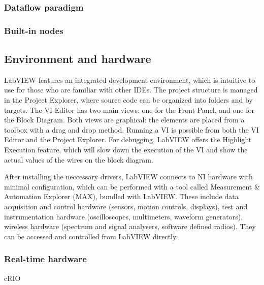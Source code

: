 \subsubsection{Dataflow paradigm}
\subsubsection{Built-in nodes}
\subsection{Environment and hardware}
LabVIEW features an integrated development environment, which is intuitive to use for those who are familiar with other IDEs. The project structure is managed in the Project Explorer, where source code can be organized into folders and by targets. The VI Editor has two main views: one for the Front Panel, and one for the Block Diagram. Both views are graphical: the elements are placed from a toolbox with a drag and drop method. Running a VI is possible from both the VI Editor and the Project Explorer. For debugging, LabVIEW offers the Highlight Execution feature, which will slow down the execution of the VI and show the actual values of the wires on the block diagram.

After installing the neccessary drivers, LabVIEW connects to NI hardware with minimal configuration, which can be performed with a tool called Measurement \& Automation Explorer (MAX), bundled with LabVIEW. These include data acquisition and control hardware (sensors, motion controls, displays), test and instrumentation hardware (oscilloscopes, multimeters, waveform generators), wireless hardware (spectrum and signal analysers, software defined radios). They can be accessed and controlled from LabVIEW directly.

\subsubsection{Real-time hardware}
cRIO

